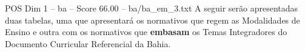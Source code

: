 \begin{textsample}{POS Dim 1 – ba – Score 66.00 – ba/ba\_em\_3.txt}
A seguir serão apresentadas duas tabelas, uma que apresentará os normativos que regem as Modalidades de Ensino e outra com os normativos que \textbf{embasam} os Temas Integradores do Documento Curricular Referencial da Bahia.

\end{textsample}
